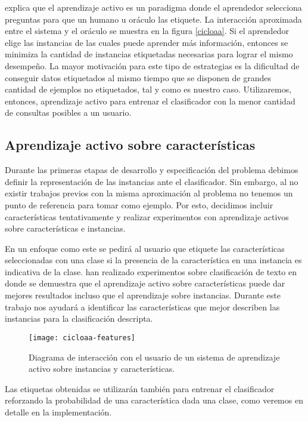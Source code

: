 \citet{settles_active_learning_survey} explica que el aprendizaje activo es un paradigma donde el aprendedor selecciona preguntas para que un humano u oráculo las etiquete. La interacción aproximada entre el sistema y el oráculo se muestra en la figura \ref{cicloaa}. Si el aprendedor elige las instancias de las cuales puede aprender más información, entonces se minimiza la cantidad de instancias etiquetadas necesarias para lograr el mismo desempeño. La mayor motivación para este tipo de estrategias es la dificultad de conseguir datos etiquetados al mismo tiempo que se disponen de grandes cantidad de ejemplos no etiquetados, tal y como es nuestro caso. Utilizaremos, entonces, aprendizaje activo para entrenar el clasificador con la menor cantidad de consultas posibles a un usuario.

\subsection{Aprendizaje activo sobre características}

Durante las primeras etapas de desarrollo y especificación del problema debimos definir la representación de las instancias ante el clasificador. Sin embargo, al no existir trabajos previos con la misma aproximación al problema no tenemos un punto de referencia para tomar como ejemplo. Por esto, decidimos incluir características tentativamente y realizar experimentos con aprendizaje activos sobre características e instancias.


En un enfoque como este se pedirá al usuario que etiquete las características seleccionadas con una clase si la presencia de la característica en una instancia es indicativa de la clase. \citet{settles-al-features} han realizado experimentos sobre clasificación de texto en donde se demuestra que el aprendizaje activo sobre características puede dar mejores resultados incluso que el aprendizaje sobre instancias. Durante este trabajo nos ayudará a identificar las características que mejor describen las instancias para la clasificación descripta.

\begin{figure}[h!]\label{aa-features}
\caption{Diagrama de interacción con el usuario de un sistema de aprendizaje activo sobre instancias y características.}
\texttt{[image: cicloaa-features]}
\centering
\end{figure}

Las etiquetas obtenidas se utilizarán también para entrenar el clasificador reforzando la probabilidad de una característica dada una clase, como veremos en detalle en la implementación.


